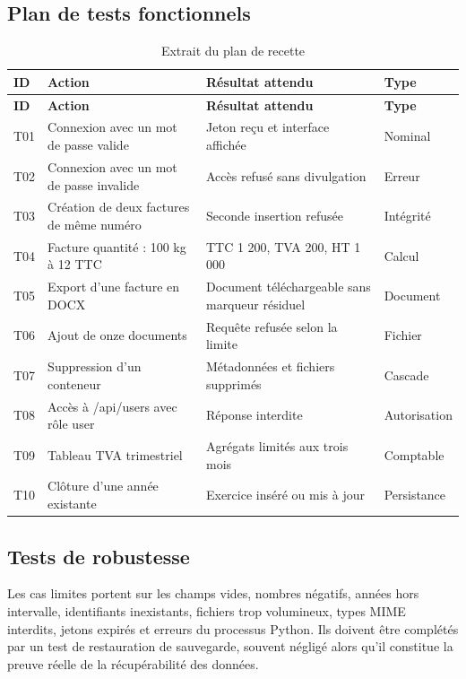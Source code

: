 \documentclass[12pt,a4paper,oneside]{report}
\begin{document}
\subsection{Plan de tests fonctionnels}
\begin{longtable}{p{1.5cm}p{5.3cm}p{5.4cm}p{2cm}}
\caption{Extrait du plan de recette}\label{tab:tests}\\
\toprule \textbf{ID} & \textbf{Action} & \textbf{Résultat attendu} & \textbf{Type}\\ \midrule
\endfirsthead
\toprule \textbf{ID} & \textbf{Action} & \textbf{Résultat attendu} & \textbf{Type}\\ \midrule
\endhead
T01 & Connexion avec un mot de passe valide & Jeton reçu et interface affichée & Nominal\\
T02 & Connexion avec un mot de passe invalide & Accès refusé sans divulgation & Erreur\\
T03 & Création de deux factures de même numéro & Seconde insertion refusée & Intégrité\\
T04 & Facture quantité : 100 kg à 12 TTC & TTC 1 200, TVA 200, HT 1 000 & Calcul\\
T05 & Export d'une facture en DOCX & Document téléchargeable sans marqueur résiduel & Document\\
T06 & Ajout de onze documents & Requête refusée selon la limite & Fichier\\
T07 & Suppression d'un conteneur & Métadonnées et fichiers supprimés & Cascade\\
T08 & Accès à /api/users avec rôle user & Réponse interdite & Autorisation\\
T09 & Tableau TVA trimestriel & Agrégats limités aux trois mois & Comptable\\
T10 & Clôture d'une année existante & Exercice inséré ou mis à jour & Persistance\\
\bottomrule
\end{longtable}

\subsection{Tests de robustesse}
Les cas limites portent sur les champs vides, nombres négatifs, années hors intervalle, identifiants inexistants, fichiers trop volumineux, types MIME interdits, jetons expirés et erreurs du processus Python. Ils doivent être complétés par un test de restauration de sauvegarde, souvent négligé alors qu'il constitue la preuve réelle de la récupérabilité des données.
\end{document}
